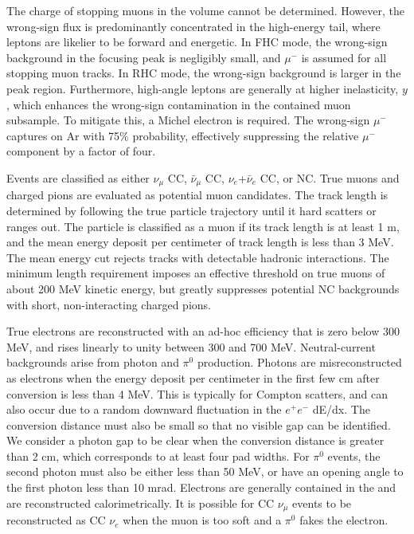 The charge of stopping muons in the  volume cannot be determined. However, the wrong-sign flux is predominantly concentrated in the high-energy tail, where leptons are likelier to be forward and energetic. In FHC mode, the wrong-sign background in the focusing peak is negligibly small, and $\mu^{-}$ is assumed for all stopping muon tracks. In RHC mode, the wrong-sign background is larger in the peak region. Furthermore, high-angle leptons are generally at higher inelasticity, $y$, which enhances the wrong-sign contamination in the contained muon subsample. To mitigate this, a Michel electron is required. The wrong-sign $\mu^{-}$ captures on Ar with 75\% probability, effectively suppressing the relative $\mu^{-}$ component by a factor of four.

Events are classified as either $\nu_{\mu}$ CC, $\bar{\nu}_{\mu}$ CC, $\nu_{e}$+$\bar{\nu}_{e}$ CC, or NC. True muons and charged pions are evaluated as potential muon candidates. The track length is determined by following the true particle trajectory until it hard scatters or ranges out. The particle is classified as a muon if its track length is at least 1 m, and the mean energy deposit per centimeter of track length is less than 3 MeV. The mean energy cut rejects tracks with detectable hadronic interactions. The minimum length requirement imposes an effective threshold on true muons of about 200 MeV kinetic energy, but greatly suppresses potential NC backgrounds with short, non-interacting charged pions.

True electrons are reconstructed with an ad-hoc efficiency that is zero below 300 MeV, and rises linearly to unity between 300 and 700 MeV. Neutral-current backgrounds arise from photon and $\pi^{0}$ production. Photons are misreconstructed as electrons when the energy deposit per centimeter in the first few cm after conversion is less than 4 MeV. This is typically for Compton scatters, and can also occur due to a random downward fluctuation in the $e^{+}e^{-}$ dE/dx. The conversion distance must also be small so that no visible gap can be identified. We consider a photon gap to be clear when the conversion distance is greater than 2 cm, which corresponds to at least four pad widths. For $\pi^{0}$ events, the second photon must also be either less than 50 MeV, or have an opening angle to the first photon less than 10 mrad. Electrons are generally contained in the  and are reconstructed calorimetrically. It is possible for CC $\nu_{\mu}$ events to be reconstructed as CC $\nu_{e}$ when the muon is too soft and a $\pi^{0}$ fakes the electron.

